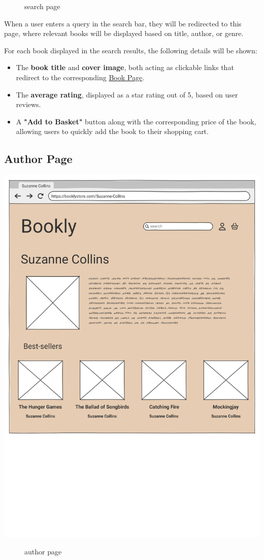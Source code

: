 \begin{figure}[h!]
    \centering
    \caption{search page}
    \label{fig:enter-label}
\end{figure}

When a user enters a query in the search bar, they will be redirected to this page, where relevant books will be displayed based on title, author, or genre.

For each book displayed in the search results, the following details will be shown:
\begin{itemize}
    \item The \textbf{book title} and \textbf{cover image}, both acting as clickable links that redirect to the corresponding \hyperref[sec:book]{Book Page}.
    \item The \textbf{average rating}, displayed as a star rating out of 5, based on user reviews.
    \item A \textbf{"Add to Basket"} button along with the corresponding price of the book, allowing users to quickly add the book to their shopping cart.
\end{itemize}

\subsection{Author Page} \label{sec:author}
\includegraphics[width=0.6\linewidth]{HW1Report/photos/AuthorPage.png}

\begin{figure}[h!]
    \centering
    \caption{author page}
    \label{fig:enter-label}
\end{figure}

